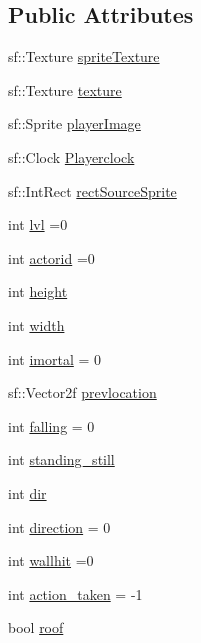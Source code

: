 \subsection*{Public Attributes}
\begin{DoxyCompactItemize}
\item 
sf\+::\+Texture \hyperlink{class_actor___class_a28e08b1eea7303fb8afbde256cddc081}{sprite\+Texture}
\item 
sf\+::\+Texture \hyperlink{class_actor___class_ac01a0438aa7e21d9c6ef4110546b1d72}{texture}
\item 
sf\+::\+Sprite \hyperlink{class_actor___class_abbef9a0bb9fe8451b95ab7dca366b777}{player\+Image}
\item 
sf\+::\+Clock \hyperlink{class_actor___class_a681f9193b51429a1c2c213e7627f9185}{Playerclock}
\item 
sf\+::\+Int\+Rect \hyperlink{class_actor___class_a95743733b62918f4cca704b96275d95f}{rect\+Source\+Sprite}
\item 
int \hyperlink{class_actor___class_acab5d3dc2a8623644b54d446b093cc7f}{lvl} =0
\item 
int \hyperlink{class_actor___class_aeeeefb9c4a5ed7b67e380dbbd5249889}{actorid} =0
\item 
int \hyperlink{class_actor___class_ac1ceeec9b55fe7cb6c657b3cf1aa81dd}{height}
\item 
int \hyperlink{class_actor___class_ab409e2de6684381c116ba5f157cfb003}{width}
\item 
int \hyperlink{class_actor___class_a9ab84f0fcab1c04e088db17d41c9dbf8}{imortal} = 0
\item 
sf\+::\+Vector2f \hyperlink{class_actor___class_a9073df26beb7a0c9801fae3caa1b4743}{prevlocation}
\item 
int \hyperlink{class_actor___class_a6230b3e81995e83745eb532f883cf7d2}{falling} = 0
\item 
int \hyperlink{class_actor___class_a162d16a5e6b738af5a7d6d84b3d5e376}{standing\+\_\+still}
\item 
int \hyperlink{class_actor___class_a19615eb6b350b927e943c203f6d6ba6b}{dir}
\item 
int \hyperlink{class_actor___class_a843a4b6d14c54fff28e5956842d4988c}{direction} = 0
\item 
int \hyperlink{class_actor___class_a51e346bc448f9f533e3b8762d6c7ea39}{wallhit} =0
\item 
int \hyperlink{class_actor___class_ad964e0b5531233ed93d765343ec266bd}{action\+\_\+taken} = -\/1
\item 
bool \hyperlink{class_actor___class_ad4f76cc4e71f3c83b41654c538a241b3}{roof}

\end{DoxyCompactItemize}
